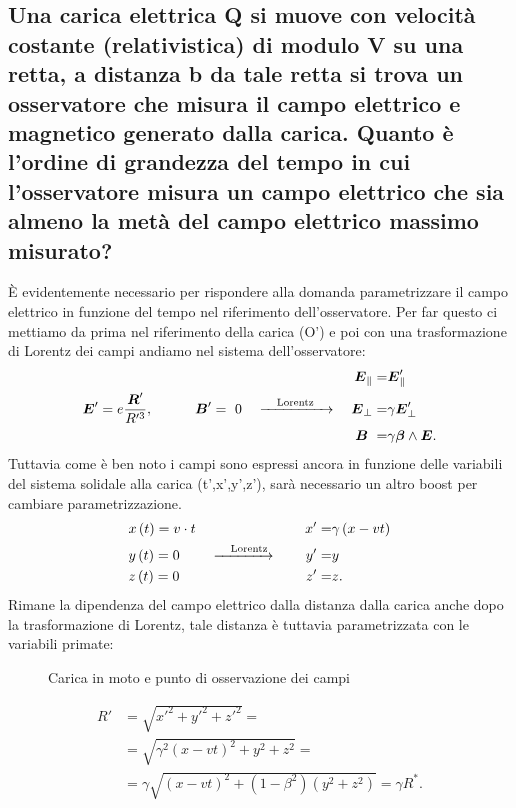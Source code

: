 \subsection[\hspace{1mm} Tempo di interazione per carica in movimento con osservatore]{Una carica elettrica Q si muove con velocità costante (relativistica) di modulo V su una retta, a distanza b da tale retta si trova un osservatore che misura il campo elettrico e magnetico generato dalla carica. Quanto è l'ordine di grandezza del tempo in cui l'osservatore misura un campo elettrico che sia almeno la metà del campo elettrico massimo misurato?}
\label{sec:3.a.15}
È evidentemente necessario per rispondere alla domanda parametrizzare il campo elettrico in funzione del tempo nel riferimento dell'osservatore. Per far questo ci mettiamo da prima nel riferimento della carica (O') e poi con una trasformazione di Lorentz dei campi andiamo nel sistema dell'osservatore:
\begin{align*}
&									&&						&\boldsymbol{E}_{\|}=&\boldsymbol{E}'_{\|} \\
& \bs{E}'= e \frac{\bs{R}'}{R'^3}, \quad \quad \quad \bs{B}'= \ 0	 &\ce{->[\quad \text{Lorentz}\quad]}&		&\bs{E}_{\bot}=&\gamma\bs{E}'_{\bot}\\ 
&									&&						&\bs{B}\ =&\gamma\bs{\beta}\wedge \bs{E} 
.\end{align*}
Tuttavia come è ben noto i campi sono espressi ancora in funzione delle variabili del sistema solidale alla carica (t',x',y',z'), sarà necessario un altro boost per cambiare parametrizzazione.
\begin{align*}
	&x\left( t \right) = v\cdot t	&&					&x'=&\gamma\left( x-vt \right) \\
	&y\left( t \right) = 0		&\ce{ ->[\quad \text{Lorentz}] \quad}&	&y'=&y \\
	&z\left( t \right) = 0		&&					&z'=&z
.\end{align*}
Rimane la dipendenza del campo elettrico dalla distanza dalla carica anche dopo la trasformazione di Lorentz, tale distanza è tuttavia parametrizzata con le variabili primate: 
\begin{figure}[ht]
    \centering
    \caption{Carica in moto e punto di osservazione dei campi}
    \label{fig:moto-carica}
\end{figure}
\begin{align*}
	R'& = \sqrt{x'^2 + y'^2 + z'^2} =\\ 
	&=\sqrt{\gamma^2\left( x-vt \right)^2 + y^2 + z^2} =\\ 
	&=\gamma \sqrt{\left( x-vt \right)^2 + \left( 1-\beta^2 \right)\left( y^2+z^2 \right)}=\gamma R^{*} 
.\end{align*}	
